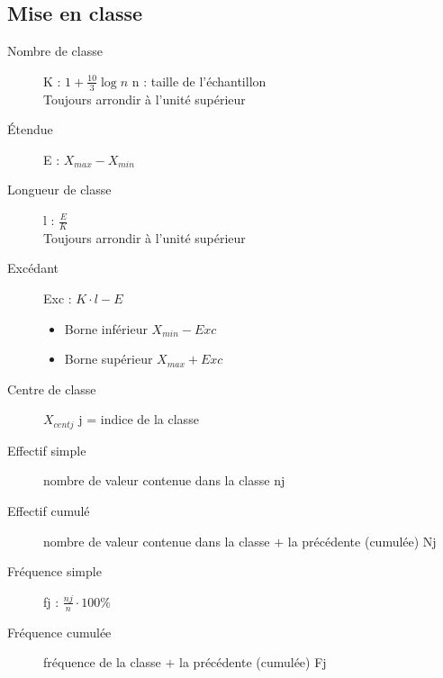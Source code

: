 \documentclass[a4paper,12pt]{article}
\newcommand\tab[1][]{\hspace*{#1}}
\newcommand\Warning{%
 \makebox[1.4em][c]{%
 \makebox[0pt][c]{\raisebox{.1em}{\small!}}%
 \makebox[0pt][c]{\color{red}\Large$\bigtriangleup$}}}%
\begin{document}
\subsection{Mise en classe}
\begin{description}%
   \item[Nombre de classe] K : $1 + \frac{10}{3} \log n$
    \tab[1cm] n : taille de l'échantillon \\
     \Warning Toujours arrondir à l'unité supérieur
   \item[Étendue] E : $X_{max} - X_{min}$
   \item[Longueur de classe] l : $\frac{E}{K}$ \\
    \Warning Toujours arrondir à l'unité supérieur
   \item[Excédant] Exc : $K\cdot l -E$
   \begin{itemize}%
         \item Borne inférieur $X_{min} - Exc$
         \item Borne supérieur $X_{max} + Exc$
    \end{itemize}
   \item[Centre de classe] $X_{centj}$ \tab[1cm] j = indice de la classe
   \item[Effectif simple] nombre de valeur contenue dans la classe nj
   \item[Effectif cumulé] nombre de valeur contenue dans la classe $+$ la précédente (cumulée) Nj 
   \item[Fréquence simple] fj : $\frac{nj}{n}\cdot 100 \%$
   \item[Fréquence cumulée] fréquence de la classe $+$ la précédente (cumulée) Fj 
\end{description}
\end{document}
